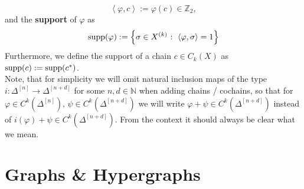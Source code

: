 \[
\left\langle\varphi,c\right\rangle:=\varphi(c)\in\mathbb{Z}_2,
\]
and the \textbf{support} of \(\varphi\) as
\[
\mathrm{supp}(\varphi):=\left\{\sigma\in X^{(k)}\text{ : }\left\langle\varphi,\sigma\right\rangle=1\right\}
\]
Furthermore, we define the support of a chain \(c\in C_k(X)\) as \(\mathrm{supp}(c):=\mathrm{supp}(c^*)\).\\
Note, that for simplicity we will omit natural inclusion maps of the type\\
\(i:\Delta^{[n]}\longrightarrow\Delta^{[n+d]}\) for some \(n,d\in\mathbb{N}\) when adding chains / cochains, so that for \(\varphi\in C^k(\Delta^{[n]})\text{, }\psi\in C^k(\Delta^{[n+d]})\) we will write \(\varphi+\psi\in C^k(\Delta^{[n+d]})\) instead of \(i(\varphi)+\psi\in C^k(\Delta^{[n+d]})\). From the context it should always be clear what we mean.


\section*{Graphs \& Hypergraphs}

